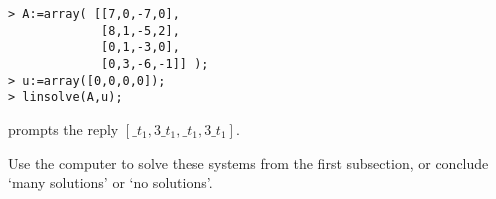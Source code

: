 \begin{exercises}
\begin{answer}
\begin{exparts}
\begin{indented}{\small
\begin{verbatim}
> A:=array( [[7,0,-7,0],
             [8,1,-5,2],
             [0,1,-3,0],
             [0,3,-6,-1]] );
> u:=array([0,0,0,0]);
> linsolve(A,u);
\end{verbatim}
}\end{indented}
         prompts the reply $[\_t_1,3\_t_1,\_t_1,3\_t_1]$.
      \end{exparts}
    \end{answer}
\item 
    Use the computer to solve these systems from the
    first subsection,
    or conclude `many solutions' or `no solutions'.
\end{exercises}
